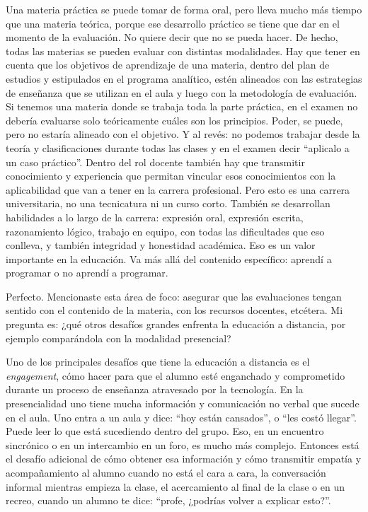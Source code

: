 \begin{description}[leftmargin=0cm, labelsep=0.5cm, style=nextline]
Una materia práctica se puede tomar de forma oral, pero lleva mucho más tiempo que una materia teórica, porque ese desarrollo práctico se tiene que dar en el momento de la evaluación. No quiere decir que no se pueda hacer. De hecho, todas las materias se pueden evaluar con distintas modalidades.
Hay que tener en cuenta que los objetivos de aprendizaje de una materia, dentro del plan de estudios y estipulados en el programa analítico, estén alineados con las estrategias de enseñanza que se utilizan en el aula y luego con la metodología de evaluación.
Si tenemos una materia donde se trabaja toda la parte práctica, en el examen no debería evaluarse solo teóricamente cuáles son los principios. Poder, se puede, pero no estaría alineado con el objetivo. Y al revés: no podemos trabajar desde la teoría y clasificaciones durante todas las clases y en el examen decir ``aplicalo a un caso práctico''.
Dentro del rol docente también hay que transmitir conocimiento y experiencia que permitan vincular esos conocimientos con la aplicabilidad que van a tener en la carrera profesional. Pero esto es una carrera universitaria, no una tecnicatura ni un curso corto. También se desarrollan habilidades a lo largo de la carrera: expresión oral, expresión escrita, razonamiento lógico, trabajo en equipo, con todas las dificultades que eso conlleva, y también integridad y honestidad académica. Eso es un valor importante en la educación. Va más allá del contenido específico: aprendí a programar o no aprendí a programar.
\item[\textbf{Entrevistadores:}] Perfecto. Mencionaste esta área de foco: asegurar que las evaluaciones tengan sentido con el contenido de la materia, con los recursos docentes, etcétera. Mi pregunta es: ¿qué otros desafíos grandes enfrenta la educación a distancia, por ejemplo comparándola con la modalidad presencial?
\item[\textbf{Entrevistada:}] Uno de los principales desafíos que tiene la educación a distancia es el \textit{engagement}, cómo hacer para que el alumno esté enganchado y comprometido durante un proceso de enseñanza atravesado por la tecnología.
En la presencialidad uno tiene mucha información y comunicación no verbal que sucede en el aula. Uno entra a un aula y dice: ``hoy están cansados'', o ``les costó llegar''. Puede leer lo que está sucediendo dentro del grupo. Eso, en un encuentro sincrónico o en un intercambio en un foro, es mucho más complejo.
Entonces está el desafío adicional de cómo obtener esa información y cómo transmitir empatía y acompañamiento al alumno cuando no está el cara a cara, la conversación informal mientras empieza la clase, el acercamiento al final de la clase o en un recreo, cuando un alumno te dice: ``profe, ¿podrías volver a explicar esto?''.

\end{description}
